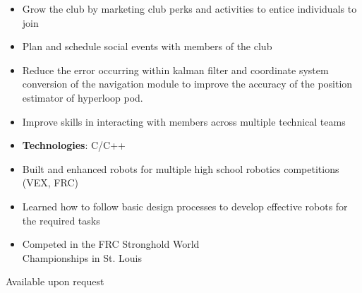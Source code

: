 \documentclass[10pt, letterpaper, ragged2e, withhyper]{altacv}
\begin{document}
\begin{paracol}{2}






    \begin{itemize}
        \item Grow the club by marketing club perks and activities to entice individuals to join
        \item Plan and schedule social events with members of the club
    \end{itemize}

    \divider
    
    \begin{itemize}
        \item Reduce the error occurring within kalman filter and coordinate system conversion of the navigation
        module to improve the accuracy of the position estimator of hyperloop pod.  
        \item Improve skills in interacting with members across multiple technical teams
        \item \textbf{Technologies}: C/C++
    \end{itemize}

    \divider

    \begin{itemize}
        \item Built and enhanced robots for multiple high school robotics competitions (VEX, FRC)
        \item Learned how to follow basic design processes to develop effective robots for the required tasks
        \item Competed in the FRC Stronghold World\\ Championships in St. Louis 
    \end{itemize}

    Available upon request

\end{paracol}
\end{document}
